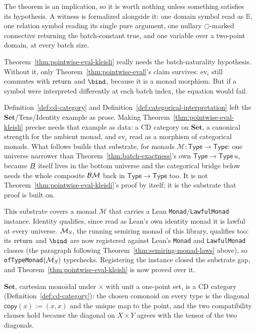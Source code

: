 The theorem is an implication, so it is worth nothing unless something
satisfies its hypothesis. A witness is formalized alongside it: one domain
symbol read as $\mathbb B$, one relation symbol reading its single pure
argument, one nullary $\bigcirc$-marked connective returning the
batch-constant $\mathrm{true}$, and one variable over a two-point domain,
at every batch size.

Theorem~\ref{thm:pointwise-eval-kleisli} really needs the
batch-naturality hypothesis. Without it, only
Theorem~\ref{thm:pointwise-eval}'s claim survives: $\mathrm{ev}_i$
still commutes with $\mathrm{return}$ and $\bind$, because it is a monad morphism.
But if a symbol were interpreted differently at each batch index, the
equation would fail.

Definition~\ref{def:cd-category} and
Definition~\ref{def:categorical-interpretation} left the
$\mathbf{Set}$/Tens/Identity example as prose. Making
Theorem~\ref{thm:pointwise-eval-kleisli} precise needs that example as
data: a CD category on $\mathbf{Set}$, a canonical strength for the
ambient monad, and $\mathrm{ev}_i$ read as a morphism of categorical
monads. What follows builds that substrate, for monads
$\mathcal M \colon \mathsf{Type} \to \mathsf{Type}$: one universe
narrower than Theorem~\ref{thm:batch-exactness}'s own
$\mathsf{Type} \to \mathsf{Type}\,u$, because $\underline B$ itself lives in
the bottom universe and the categorical bridge below needs the whole
composite $\mathcal B\mathcal M$ back in $\mathsf{Type} \to \mathsf{Type}$
too. It is not Theorem~\ref{thm:pointwise-eval-kleisli}'s proof by itself; it
is the substrate that proof is built on.

This substrate covers a monad $\mathcal M$ that carries a Lean
\texttt{Monad}/\texttt{LawfulMonad} instance. $\mathrm{Identity}$
qualifies, since read as Lean's own identity monad it is lawful at
every universe. $\mathcal M_{S}$, the running semiring monad of this library,
qualifies too: its $\mathrm{return}$ and $\bind$ are now registered against Lean's
\texttt{Monad} and \texttt{LawfulMonad} classes (the paragraph
following Theorem~\ref{thm:semiring-monad-laws} above), so
\texttt{ofTypeMonad}$(\mathcal M_{S})$ typechecks. Registering the instance
closed the substrate gap, and Theorem~\ref{thm:pointwise-eval-kleisli} is
now proved over it.

\begin{definition}
\label{def:type-cd-category}
\leanok
$\mathbf{Set}$, cartesian monoidal under $\times$ with unit a
one-point set, is a CD category (Definition~\ref{def:cd-category}):
the chosen comonoid on every type is the diagonal
$\mathsf{copy}(x) := (x,x)$ and the unique map to the point, and the
two compatibility clauses hold because the diagonal on $X \times Y$
agrees with the tensor of the two diagonals.
\end{definition}

